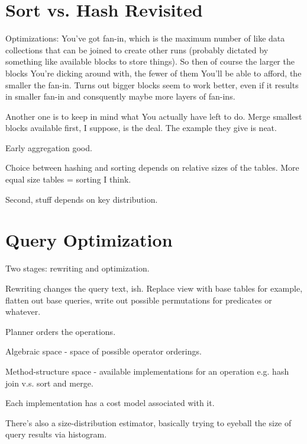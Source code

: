 \documentclass{article}
\begin{document}
		
		
		
			
			
		
	
		
		
		
		
		
		
		
		
		
		
\newpage
\section{Sort vs. Hash Revisited }

	Optimizations: You've got fan-in, which is the maximum number of like data collections that can be joined to create other runs (probably dictated by something like available blocks to store things). So then of course the larger the blocks You're dicking around with, the fewer of them You'll be able to afford, the smaller the fan-in. Turns out bigger blocks seem to work better, even if it results in smaller fan-in and consquently maybe more layers of fan-ins.
		
	Another one is to keep in mind what You actually have left to do. Merge smallest blocks available first, I suppose, is the deal. The example they give is neat.
	
	Early aggregation good.
	
	Choice between hashing and sorting depends on relative sizes of the tables. More equal size tables = sorting I think.
	
	Second, stuff depends on key distribution.
		
\newpage
\section{Query Optimization}	

	Two stages: rewriting and optimization.
	
	Rewriting changes the query text, ish. Replace view with base tables for example, flatten out base queries, write out possible permutations for predicates or whatever.
	
	Planner orders the operations.
	
	Algebraic space - space of possible operator orderings.
	
	Method-structure space - available implementations for an operation e.g. hash join v.s. sort and merge.
	
	Each implementation has a cost model associated with it.
	
	There's also a size-distribution estimator, basically trying to eyeball the size of query results via histogram.
		
\end{document}
